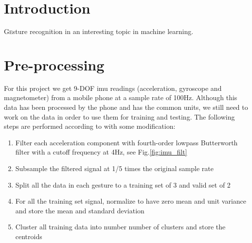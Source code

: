 \documentclass[twoside]{article}
\begin{document}
\begin{multicols}{2} %

\section{Introduction}
\lettrine[nindent=0em,lines=2]{G}esture recognition in an interesting topic in machine learning.


\section{Pre-processing}

For this project we get 9-DOF imu readings (acceleration, gyroscope and magnetometer) from a mobile phone at a sample rate of 100Hz. Although this data has been processed by the phone and has the common units, we still need to work on the data in order to use them for training and testing. The following steps are performed according to \cite{Vesa00} with some modification:

\begin{enumerate}
	\item Filter each acceleration component with fourth-order lowpass Butterworth filter with a cutoff frequency at 4Hz, see Fig.\ref{fig:imu_filt}
	\item Subsample the filtered signal at 1/5 times the original sample rate
	\item Split all the data in each gesture to a training set of 3 and valid set of 2
	\item For all the training set signal, normalize to have zero mean and unit variance and store the mean and standard deviation
	\item Cluster all training data into number number of clusters and store the centroids
\end{enumerate}


\end{multicols}
\end{document}
